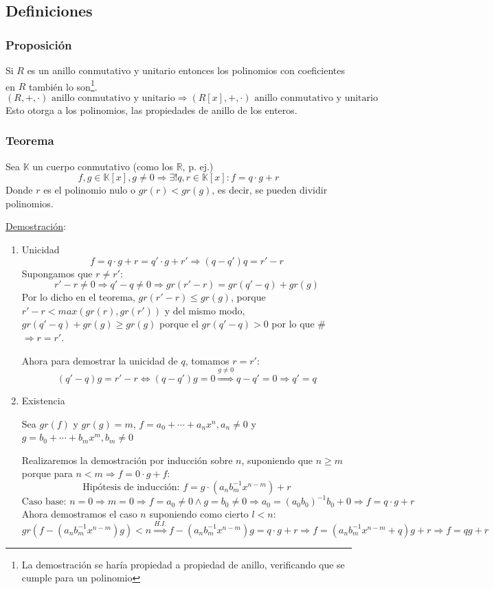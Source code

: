 \documentclass[10pt,a4paper,openright]{book}
\theoremstyle{break}
\begin{document}
\subsection{Definiciones}
\subsubsection*{Proposición}
Si $R$ es un anillo conmutativo y unitario entonces los polinomios con coeficientes en $R$ también lo son\footnote{La demostración se haría propiedad a propiedad de anillo, verificando que se cumple para un polinomio}.
$$(R,+,\cdot)\mbox{ anillo conmutativo y unitario} \Rightarrow (R[x],+,\cdot) \mbox{ anillo conmutativo y unitario}$$
Esto otorga a los polinomios, las propiedades de anillo de los enteros.

\subsubsection*{Teorema}
Sea $\mathbb K$ un cuerpo conmutativo (como los $\mathbb R$, p. ej.)
$$f,g \in \mathbb K[x], g\neq 0 \Rightarrow \exists!q,r\in \mathbb K[x] : f=q\cdot g+r$$ 
Donde $r$ es el polinomio nulo o $gr(r)<gr(g)$, es decir, se pueden dividir polinomios.\par
\underline{Demostración}:
\begin{enumerate}
\item Unicidad
$$f=q\cdot g+r= q'\cdot g+r'\Rightarrow (q-q')q=r'-r$$
Supongamos que $r\neq r'$:
$$r'-r\neq 0\Rightarrow q'-q\neq 0 \Rightarrow gr(r'-r)=gr(q'-q)+gr(g)$$
Por lo dicho en el teorema, $gr(r'-r)\leq gr(g)$, porque $r'-r<max\left( gr(r),gr(r')\right)$ y del mismo modo, $gr(q'-q)+gr(g)\geq gr(g)$ porque el $gr(q'-q)>0$ por lo que \# $\Rightarrow r=r'$.\par
Ahora para demostrar la unicidad de $q$, tomamos $r=r'$:
$$(q'-q)g=r'-r\Leftrightarrow (q-q')g=0\stackrel{g\neq 0}{\Rightarrow }q-q'=0\Rightarrow q'=q$$

\item Existencia\par
Sea $gr(f)$ y $gr(g)=m$, $f=a_0+\cdots+a_nx^n, a_n\neq 0$ y $g=b_0+\cdots+b_mx^m, b_m\neq 0$\par
Realizaremos la demostración por inducción sobre $n$, suponiendo que $n\geq m$ porque para $n<m\Rightarrow f=0\cdot g +f$:
$$\mbox{Hipótesis de inducción: } f=g\cdot (a_nb_m^{-1}x^{n-m})+r$$
$$\mbox{Caso base: }n=0\Rightarrow m=0\Rightarrow f=a_0\neq 0 \wedge g=b_0\neq 0\Rightarrow a_0=(a_0b_0)^{-1}b_0+0\Rightarrow f=q\cdot g+ r$$
Ahora demostramos el caso $n$ suponiendo como cierto $l<n$:
$$gr(f-(a_nb_m^{-1}x^{n-m})g)<n\stackrel{H.I.}{\Rightarrow}f-(a_nb_m^{-1}x^{n-m})g=q\cdot g+r\Rightarrow f=(a_nb_m^{-1}x^{n-m}+q)g+r\Rightarrow f=qg+r$$
\end{enumerate}
\end{document}
